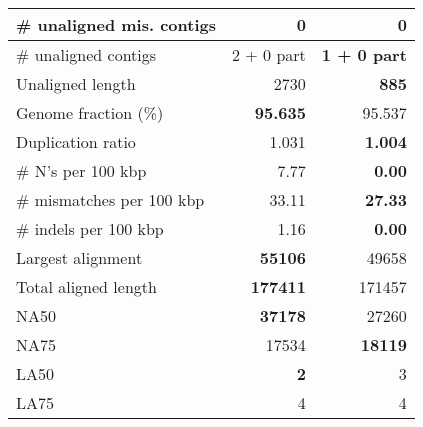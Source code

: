 \documentclass[12pt,a4paper]{article}
\begin{document}
\begin{table}[ht]
\begin{center}
\begin{tabular}{|l*{2}{|r}|}
\# unaligned mis. contigs & 0 & 0 \\ \hline
\# unaligned contigs & 2 + 0 part & {\bf 1 + 0 part} \\ \hline
Unaligned length & 2730 & {\bf 885} \\ \hline
Genome fraction (\%) & {\bf 95.635} & 95.537 \\ \hline
Duplication ratio & 1.031 & {\bf 1.004} \\ \hline
\# N's per 100 kbp & 7.77 & {\bf 0.00} \\ \hline
\# mismatches per 100 kbp & 33.11 & {\bf 27.33} \\ \hline
\# indels per 100 kbp & 1.16 & {\bf 0.00} \\ \hline
Largest alignment & {\bf 55106} & 49658 \\ \hline
Total aligned length & {\bf 177411} & 171457 \\ \hline
NA50 & {\bf 37178} & 27260 \\ \hline
NA75 & 17534 & {\bf 18119} \\ \hline
LA50 & {\bf 2} & 3 \\ \hline
LA75 & 4 & 4 \\ \hline
\end{tabular}
\end{center}
\end{table}
\end{document}
